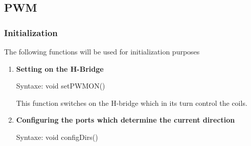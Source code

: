 \documentclass[11pt,a4paper]{report}
\begin{document}
\subsection{PWM} 

\subsubsection{Initialization}

The following functions will be used for initialization purposes 

\begin{enumerate}
	\item 
		\textbf{Setting on the H-Bridge}
		
		Syntaxe: void setPWMON()
		
		This function switches on the H-bridge which in its turn control the coils. 

		\begin{table}[H]
			\centering
			\caption{PWM-ON}
			\label{on_pwm}
		\end{table}
\item 
	\textbf{Configuring the ports which determine the current direction}
	
	Syntaxe: void configDirs()
	
	\begin{table}[H]
\centering
{}
\caption{Configure the ports for the direction}
\label{config_dirs}
\end{table}
	

\end{enumerate}
\end{document}
